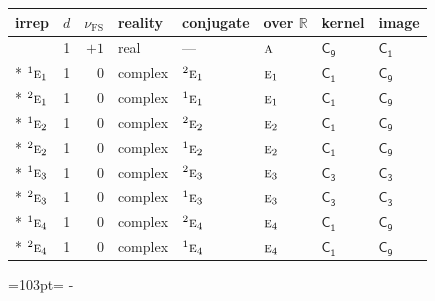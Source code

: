 \documentclass[10pt,a4paper]{article}
\newcommand{\needspace}[1]{\par\penalty-100\begingroup\dimen0=#1\relax\dimen2=\pagegoal
  \advance\dimen2-\pagetotal\ifdim\dimen0>\dimen2\relax\ifdim\dimen2>0pt\vfil\break\fi\fi
  \endgroup}
\numberwithin{equation}{section}
\newcommand{\grp}[1]{\mathsf{#1}}
\newcommand{\irr}[1]{\text{\normalfont\scshape #1}}
\newcommand{\conjpair}[1]{{}^{#1}}
\newcommand{\detbox}[1]{{\setlength{\fboxsep}{1pt}\fbox{#1}}}
\newcommand{\fsind}{\nu_{\mathrm{FS}}}
\begin{document}
{\small\renewcommand{\arraystretch}{1.25}\setlength{\tabcolsep}{4pt}\begin{longtable}{@{}lrrlllll@{}}\toprule
irrep & $d$ & $\fsind$ & reality & conjugate & over $\mathbb{R}$ & kernel & image\\\midrule\endhead
\bottomrule\endfoot\endlastfoot
\detbox{$\irr{a}$} & 1 & $+1$ & real & --- & $\irr{a}$ & \href{C9.pdf}{$\grp{C_{9}}$} & \href{C1.pdf}{$\grp{C_{1}}$}\\*
$\conjpair{1}\irr{e}_{1}$ & 1 & $0$ & complex & $\conjpair{2}\irr{e}_{1}$ & $\irr{e}_{1}$ & \href{C1.pdf}{$\grp{C_{1}}$} & \href{C9.pdf}{$\grp{C_{9}}$}\\*
$\conjpair{2}\irr{e}_{1}$ & 1 & $0$ & complex & $\conjpair{1}\irr{e}_{1}$ & $\irr{e}_{1}$ & \href{C1.pdf}{$\grp{C_{1}}$} & \href{C9.pdf}{$\grp{C_{9}}$}\\*
$\conjpair{1}\irr{e}_{2}$ & 1 & $0$ & complex & $\conjpair{2}\irr{e}_{2}$ & $\irr{e}_{2}$ & \href{C1.pdf}{$\grp{C_{1}}$} & \href{C9.pdf}{$\grp{C_{9}}$}\\*
$\conjpair{2}\irr{e}_{2}$ & 1 & $0$ & complex & $\conjpair{1}\irr{e}_{2}$ & $\irr{e}_{2}$ & \href{C1.pdf}{$\grp{C_{1}}$} & \href{C9.pdf}{$\grp{C_{9}}$}\\*
$\conjpair{1}\irr{e}_{3}$ & 1 & $0$ & complex & $\conjpair{2}\irr{e}_{3}$ & $\irr{e}_{3}$ & \href{C3.pdf}{$\grp{C_{3}}$} & \href{C3.pdf}{$\grp{C_{3}}$}\\*
$\conjpair{2}\irr{e}_{3}$ & 1 & $0$ & complex & $\conjpair{1}\irr{e}_{3}$ & $\irr{e}_{3}$ & \href{C3.pdf}{$\grp{C_{3}}$} & \href{C3.pdf}{$\grp{C_{3}}$}\\*
$\conjpair{1}\irr{e}_{4}$ & 1 & $0$ & complex & $\conjpair{2}\irr{e}_{4}$ & $\irr{e}_{4}$ & \href{C1.pdf}{$\grp{C_{1}}$} & \href{C9.pdf}{$\grp{C_{9}}$}\\*
$\conjpair{2}\irr{e}_{4}$ & 1 & $0$ & complex & $\conjpair{1}\irr{e}_{4}$ & $\irr{e}_{4}$ & \href{C1.pdf}{$\grp{C_{1}}$} & \href{C9.pdf}{$\grp{C_{9}}$}\\
\bottomrule\end{longtable}}
\needspace{103pt}
\end{document}
